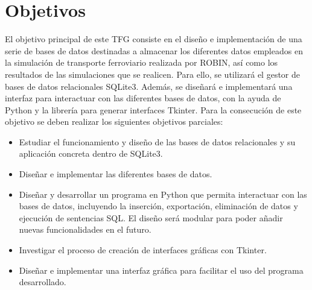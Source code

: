 \chapter{Objetivos}
\label{ch:objetivos}

El objetivo principal de este \acrfull{TFG} consiste en el diseño e implementación de una serie de bases de datos destinadas a almacenar los diferentes datos empleados en la simulación de transporte ferroviario realizada por \acrshort{ROBIN}, así como los resultados de las simulaciones que se realicen. Para ello, se utilizará el gestor de bases de datos relacionales SQLite3. Además, se diseñará e implementará una interfaz para interactuar con las diferentes bases de datos, con la ayuda de Python y la librería para generar interfaces Tkinter. Para la consecución de este objetivo se deben realizar los siguientes objetivos parciales:

\begin{itemize}

\item Estudiar el funcionamiento y diseño de las bases de datos relacionales y su aplicación concreta dentro de SQLite3.

\item Diseñar e implementar las diferentes bases de datos.

\item Diseñar y desarrollar un programa en Python que permita interactuar con las bases de datos, incluyendo la inserción, exportación, eliminación de datos y ejecución de sentencias SQL. El diseño será modular para poder añadir nuevas funcionalidades en el futuro.

\item Investigar el proceso de creación de interfaces gráficas con Tkinter.

\item Diseñar e implementar una interfaz gráfica para facilitar el uso del programa desarrollado.
\end{itemize}